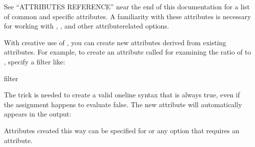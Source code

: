 \documentclass[letterpaper,10pt,english]{sphinxmanual}
\begin{document}
\sphinxAtStartPar
See “ATTRIBUTES REFERENCE” near the end of this documentation for a list
of common and {\hyperref[\detokenize{mariadb-query-digest:cmdoption-mariadb-query-digest-type}]{}} specific attributes.  A familiarity with these
attributes is necessary for working with {\hyperref[\detokenize{mariadb-query-digest:cmdoption-mariadb-query-digest-filter}]{}},
{\hyperref[\detokenize{mariadb-query-digest:cmdoption-mariadb-query-digest-ignore-attributes}]{}}, and other attribute\sphinxhyphen{}related options.

\sphinxAtStartPar
With creative use of {\hyperref[\detokenize{mariadb-query-digest:cmdoption-mariadb-query-digest-filter}]{}}, you can create new attributes derived
from existing attributes.  For example, to create an attribute called
 for examining the ratio of  to ,
specify a filter like:

\begin{sphinxVerbatim}[commandchars=\\\{\}]
\PYGZhy{}\PYGZhy{}filter 
\end{sphinxVerbatim}

\sphinxAtStartPar
The  trick is needed to create a valid one\sphinxhyphen{}line syntax that is always
true, even if the assignment happens to evaluate false.  The new attribute will
automatically appears in the output:

\begin{sphinxVerbatim}[commandchars=\\\{\}]
\end{sphinxVerbatim}

\sphinxAtStartPar
Attributes created this way can be specified for {\hyperref[\detokenize{mariadb-query-digest:cmdoption-mariadb-query-digest-order-by}]{}} or any
option that requires an attribute.
\end{document}
